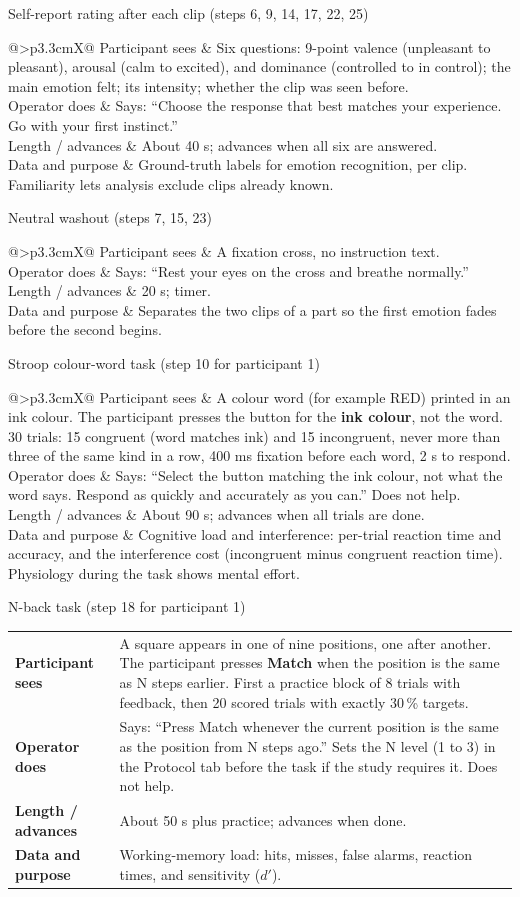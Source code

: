 \documentclass[11pt,a4paper]{article}
\makeatletter
\newcommand{\ui}[1]{\textsf{\textbf{#1}}}
\newcommand{\stepdetail}[4]{%
  \begin{tabularx}{\linewidth}{@{}>{\bfseries}p{3.3cm}X@{}}
    Participant sees & #1 \\
    Operator does & #2 \\
    Length / advances & #3 \\
    Data and purpose & #4 \\
  \end{tabularx}}
\makeatother
\begin{document}
\begin{stepbox}{Self-report rating after each clip (steps 6, 9, 14, 17, 22, 25)}
\stepdetail{Six questions: 9-point valence (unpleasant to pleasant), arousal (calm to excited), and dominance
(controlled to in control); the main emotion felt; its intensity; whether the clip was seen before.}
{Says: ``Choose the response that best matches your experience. Go with your first instinct.''}
{About 40 s; advances when all six are answered.}
{Ground-truth labels for emotion recognition, per clip. Familiarity lets analysis exclude clips already known.}
\end{stepbox}

\begin{stepbox}{Neutral washout (steps 7, 15, 23)}
\stepdetail{A fixation cross, no instruction text.}
{Says: ``Rest your eyes on the cross and breathe normally.''}
{20 s; timer.}
{Separates the two clips of a part so the first emotion fades before the second begins.}
\end{stepbox}

\begin{stepbox}{Stroop colour-word task (step 10 for participant 1)}
\stepdetail{A colour word (for example RED) printed in an ink colour. The participant presses the button for the
\textbf{ink colour}, not the word. 30 trials: 15 congruent (word matches ink) and 15 incongruent, never more than three of
the same kind in a row, 400 ms fixation before each word, 2 s to respond.}
{Says: ``Select the button matching the ink colour, not what the word says. Respond as quickly and accurately as you
can.'' Does not help.}
{About 90 s; advances when all trials are done.}
{Cognitive load and interference: per-trial reaction time and accuracy, and the interference cost (incongruent
minus congruent reaction time). Physiology during the task shows mental effort.}
\end{stepbox}

\begin{stepbox}{N-back task (step 18 for participant 1)}
\stepdetail{A square appears in one of nine positions, one after another. The participant presses \ui{Match} when the
position is the same as N steps earlier. First a practice block of 8 trials with feedback, then 20 scored trials
with exactly 30\,\% targets.}
{Says: ``Press Match whenever the current position is the same as the position from N steps ago.'' Sets the N level
(1 to 3) in the Protocol tab before the task if the study requires it. Does not help.}
{About 50 s plus practice; advances when done.}
{Working-memory load: hits, misses, false alarms, reaction times, and sensitivity ($d'$).}
\end{stepbox}
\end{document}
